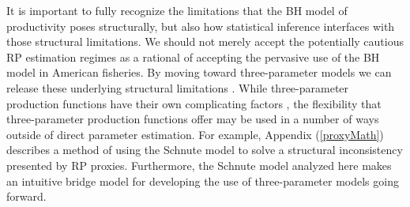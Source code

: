 %
It is important to fully recognize the limitations that the BH model of 
productivity poses structurally, but also how statistical inference 
interfaces with those structural limitations. %
We should not merely accept the potentially cautious RP estimation regimes as 
a rational of accepting the pervasive use of the BH model in American 
fisheries.
By moving toward three-parameter models we can release these underlying 
structural limitations \cite{mangel_perspective_2013}.
While three-parameter production functions 
have their own complicating factors \cite{punt_extending_2019}, the flexibility 
that three-parameter production functions offer may be used in a number of ways 
outside of direct parameter estimation. For example, Appendix (\ref{proxyMath}) 
describes a method of using the Schnute model to solve a structural inconsistency 
presented by RP proxies. 
Furthermore, the Schnute model analyzed here makes an intuitive bridge model 
for developing the use of three-parameter models going forward.


%




